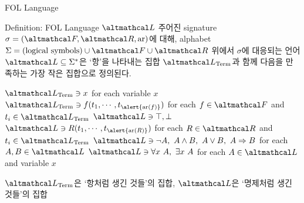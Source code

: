 \documentclass[../231120_msquare_computational-logic.tex]{subfiles}
\begin{document}
\begin{frame}{FOL Language}
    \begin{block}{Definition: FOL Language \(\mcal L\)}
        주어진 signature \(\sigma = (\mcal F, \mcal R, \mrm{ar})\)에 대해,
        alphabet \(\Sigma = (\text{logical symbols}) \cup \mcal F \cup \mcal R\) 위에서
        \alert{\(\sigma\)에 대응}되는 언어 \(\mcal L \subseteq \Sigma^\ast\)은
        `항'을 나타내는 집합 \(\mcal L_\text{Term}\)과 함께
        다음을 만족하는 \alert{가장 작은 집합}으로 정의된다.
        \begin{itemize}
            \ii \(\mcal L_\text{Term} \ni x\) \hfill for each \alert{variable} \(x\)
            \ii \(\mcal L_\text{Term} \ni f(t_1, \cdots, t_{\alert{\mrm{ar}(f)}})\)
                \hfill for each \alert{\(f \in \mcal F\)} and \(t_i \in \mcal L_\text{Term}\)
            \ii \(\mcal L \ni \top, \bot\)
            \ii \(\mcal L \ni R(t_1, \cdots, t_{\alert{\mrm{ar}(R)}})\)
                \hfill for each \alert{\(R \in \mcal R\)} and \(t_i \in \mcal L_\text{Term}\)
            \ii \(\mcal L \ni \lnot A,\ A \land B,\ A \lor B,\ A \Rightarrow B\)
                \hfill for each \(A, B \in \mcal L\)
            \ii \(\mcal L \ni \forall x\ A,\ \exs x\ A\)
                \hfill for each \(A \in \mcal L\) and variable \(x\)
        \end{itemize}
    \end{block}
    \pause
    \begin{alertblock}{}
        \(\mcal L_\text{Term}\)은 `항처럼 생긴 것들'의 집합,
        \(\mcal L\)은 `명제처럼 생긴 것들'의 집합
    \end{alertblock}
\end{frame}
\end{document}
